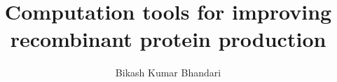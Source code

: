 \author{Bikash Kumar Bhandari}

\title{\bfseries Computation tools for improving recombinant protein production}






